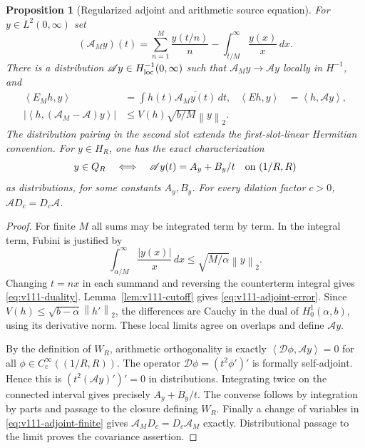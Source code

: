\documentclass[11pt]{article}
\newtheorem{proposition}[theorem]{Proposition}
\theoremstyle{remark}
\newcommand{\norm}[1]{\left\lVert #1\right\rVert}
\newcommand{\ip}[2]{\left\langle #1,#2\right\rangle}
\begin{document}
\begin{proposition}[Regularized adjoint and arithmetic source equation]\label{prop:v111-adjoint}
For $y\in L^2(0,\infty)$ set
\begin{equation}\label{eq:v111-adjoint-finite}
 (\mathscr A_My)(t)=\sum_{n=1}^M\frac{y(t/n)}n
                       -\int_{t/M}^\infty\frac{y(x)}x\,dx.
\end{equation}
There is a distribution $\mathscr Ay\in H^{-1}_{\rm loc}(0,\infty)$
such that $\mathscr A_My\to\mathscr Ay$ locally in $H^{-1}$, and
\begin{align}
 \ip{E_Mh}{y}&=\int h(t)\overline{\mathscr A_My(t)}\,dt,
 &\ip{Eh}{y}&=\ip{h}{\mathscr Ay},\label{eq:v111-duality}\\
 |\ip{h}{(\mathscr A_M-\mathscr A)y}|
 &\le V(h)\sqrt{b/M}\norm y_2.\label{eq:v111-adjoint-error}
\end{align}
The distribution pairing in the second slot extends the first-slot-linear
Hermitian convention. For $y\in H_R$, one has the exact characterization
\begin{equation}\label{eq:v111-arithmetic-equation}
 y\in Q_R\quad\Longleftrightarrow\quad
 \mathscr Ay(t)=A_y+B_y/t\quad\hbox{on }(1/R,R)
\end{equation}
as distributions, for some constants $A_y,B_y$.
For every dilation factor $c>0$, $\mathscr A D_c=D_c\mathscr A$.
\end{proposition}
\begin{proof}
For finite $M$ all sums may be integrated term by term. In the integral
term, Fubini is justified by
\[
 \int_{\alpha/M}^\infty\frac{|y(x)|}{x}\,dx
 \le\sqrt{M/\alpha}\norm y_2.
\]
Changing $t=nx$ in each summand and reversing the counterterm integral
gives \eqref{eq:v111-duality}. Lemma~\ref{lem:v111-cutoff} gives
\eqref{eq:v111-adjoint-error}. Since
$V(h)\le\sqrt{b-\alpha}\norm{h'}_2$, the differences are Cauchy in
the dual of $H_0^1(\alpha,b)$, using its derivative norm. These local
limits agree on overlaps and define $\mathscr Ay$.

By the definition of $W_R$, arithmetic orthogonality is exactly
$\ip{\mathcal D\phi}{\mathscr Ay}=0$ for all
$\phi\in C_c^\infty((1/R,R))$. The operator
$\mathcal D\phi=(t^2\phi')'$ is formally self-adjoint. Hence this is
$(t^2(\mathscr Ay)')'=0$ in distributions. Integrating twice on the
connected interval gives precisely $A_y+B_y/t$. The converse follows
by integration by parts and passage to the closure defining $W_R$.
Finally a change of variables in \eqref{eq:v111-adjoint-finite} gives
$\mathscr A_MD_c=D_c\mathscr A_M$ exactly. Distributional passage
to the limit proves the covariance assertion.
\end{proof}
\end{document}
